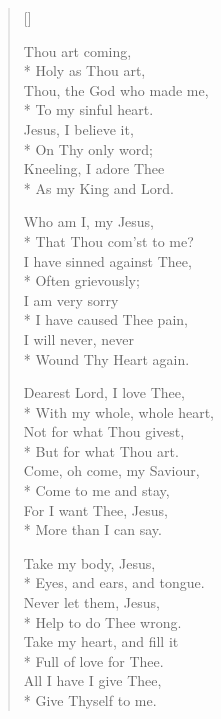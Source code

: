 \newHymn
{}

\begin{verse}[\versewidth]
\begin{altverse}
 Thou art coming,\\*
Holy as Thou art,\\
Thou, the God who made me,\\*
To my sinful heart.\\
Jesus, I believe it,\\*
On Thy only word;\\
Kneeling, I adore Thee\\*
As my King and Lord.
\end{altverse}

\begin{altverse}
 Who am I, my Jesus,\\*
That Thou com'st to me?\\
I have sinned against Thee,\\*
Often grievously;\\
I am very sorry\\*
I have caused Thee pain,\\
I will never, never\\*
Wound Thy Heart again.
\end{altverse}

\begin{altverse}
 Dearest Lord, I love Thee,\\*
With my whole, whole heart,\\
Not for what Thou givest,\\*
But for what Thou art.\\
Come, oh come, my Saviour,\\*
Come to me and stay,\\
For I want Thee, Jesus,\\*
More than I can say.
\end{altverse}

\begin{altverse}
Take my body, Jesus,\\*
Eyes, and ears, and tongue.\\
Never let them, Jesus,\\*
Help to do Thee wrong.\\
Take my heart, and fill it\\*
Full of love for Thee.\\
All I have I give Thee,\\*
Give Thyself to me.
\end{altverse}

\end{verse}

